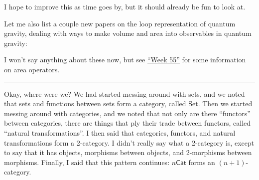 \documentclass{article}
\def\tightlist{}
\renewcommand{\texttt}[1]{%
  \begingroup
  \ttfamily
  \begingroup\lccode`~=`/\lowercase{\endgroup\def~}{/\discretionary{}{}{}}%
  \begingroup\lccode`~=`[\lowercase{\endgroup\def~}{[\discretionary{}{}{}}%
  \begingroup\lccode`~=`.\lowercase{\endgroup\def~}{.\discretionary{}{}{}}%
  \catcode`/=\active\catcode`[=\active\catcode`.=\active
  \scantokens{#1\noexpand}%
  \endgroup
}
\begin{document}

I hope to improve this as time goes by, but it should already be fun to
look at.

Let me also list a couple new papers on the loop representation of
quantum gravity, dealing with ways to make volume and area into
observables in quantum gravity:


I won't say anything about these now, but see
\protect\hyperlink{week55}{``Week 55''} for some information on area
operators.

\begin{center}\rule{0.5\linewidth}{0.5pt}\end{center}

Okay, where were we? We had started messing around with sets, and we
noted that sets and functions between sets form a category, called Set.
Then we started messing around with categories, and we noted that not
only are there ``functors'' between categories, there are things that
ply their trade between functors, called ``natural transformations''. I
then said that categories, functors, and natural transformations form a
2-category. I didn't really say what a 2-category is, except to say that
it has objects, morphisms between objects, and 2-morphisms between
morphisms. Finally, I said that this pattern continues:
\(n\mathsf{Cat}\) forms an \((n+1)\)-category.
\end{document}
